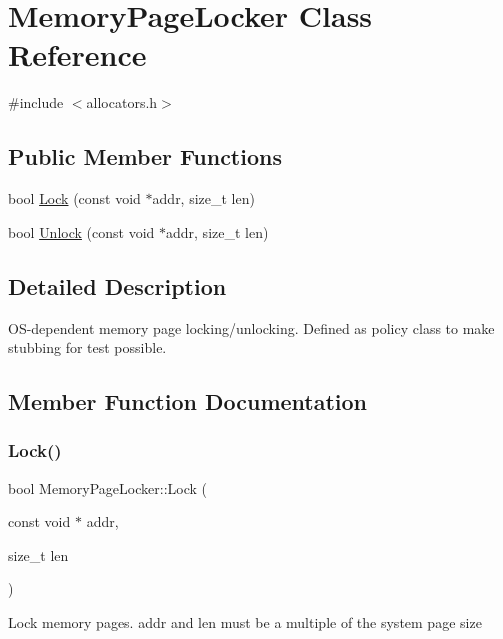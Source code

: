 \hypertarget{class_memory_page_locker}{}\section{Memory\+Page\+Locker Class Reference}
\label{class_memory_page_locker}


{\ttfamily \#include $<$allocators.\+h$>$}

\subsection*{Public Member Functions}
\begin{DoxyCompactItemize}
\item 
bool \mbox{\hyperlink{class_memory_page_locker_af411b6f6320864616cdd1b28ba9201fe}{Lock}} (const void $\ast$addr, size\+\_\+t len)
\item 
bool \mbox{\hyperlink{class_memory_page_locker_af9e9ad0edadcd8250db05f95cd6a49a7}{Unlock}} (const void $\ast$addr, size\+\_\+t len)
\end{DoxyCompactItemize}


\subsection{Detailed Description}
O\+S-\/dependent memory page locking/unlocking. Defined as policy class to make stubbing for test possible. 

\subsection{Member Function Documentation}
\mbox{\label{class_memory_page_locker_af411b6f6320864616cdd1b28ba9201fe}} 
\subsubsection{\texorpdfstring{Lock()}{Lock()}}
{\footnotesize\ttfamily bool Memory\+Page\+Locker\+::\+Lock (\begin{DoxyParamCaption}\item[{const void $\ast$}]{addr,  }\item[{size\+\_\+t}]{len }\end{DoxyParamCaption})}

Lock memory pages. addr and len must be a multiple of the system page size \mbox{\label{class_memory_page_locker_af9e9ad0edadcd8250db05f95cd6a49a7}} 
